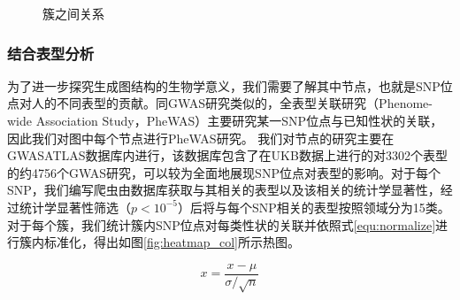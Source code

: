 \begin{figure}[ht]
\centering
{}
\caption{簇之间关系}
\label{fig:relation_between_cluster}
\end{figure}

\subsubsection{结合表型分析}

为了进一步探究生成图结构的生物学意义，我们需要了解其中节点，也就是SNP位点对人的不同表型的贡献。同GWAS研究类似的，全表型关联研究（Phenome-wide Association Study，PheWAS）主要研究某一SNP位点与已知性状的关联\cite{pendergrass_use_2011}，因此我们对图中每个节点进行PheWAS研究。
我们对节点的研究主要在GWASATLAS数据库内进行\cite{watanabe_global_2019}，该数据库包含了在UKB数据上进行的对3302个表型的约4756个GWAS研究，可以较为全面地展现SNP位点对表型的影响。对于每个SNP，我们编写爬虫由数据库获取与其相关的表型以及该相关的统计学显著性，经过统计学显著性筛选（$p<10^{-5}$）后将与每个SNP相关的表型按照领域分为15类。
对于每个簇，我们统计簇内SNP位点对每类性状的关联并依照式\ref{equ:normalize}进行簇内标准化，得出如图\ref{fig:heatmap_col}所示热图。

\begin{equation}\label{equ:normalize}
	x = \frac{x-\mu}{\sigma/\sqrt{n}}
\end{equation}

